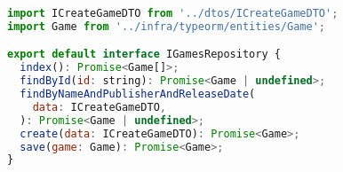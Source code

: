 \begin{lstlisting}[language=JavaScript, caption={IGamesRepository.ts},captionpos=b, label=alg:igamerepository]
import ICreateGameDTO from '../dtos/ICreateGameDTO';
import Game from '../infra/typeorm/entities/Game';

export default interface IGamesRepository {
  index(): Promise<Game[]>;
  findById(id: string): Promise<Game | undefined>;
  findByNameAndPublisherAndReleaseDate(
    data: ICreateGameDTO,
  ): Promise<Game | undefined>;
  create(data: ICreateGameDTO): Promise<Game>;
  save(game: Game): Promise<Game>;
}
  
\end{lstlisting}